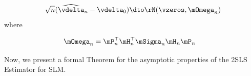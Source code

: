\documentclass[english,12pt]{book}\usepackage[]{graphicx}\usepackage[]{xcolor}
\begin{document}
\begin{equation*}
\sqrt{n}(\widehat{\vdelta}_{n} - \vdelta_0) \dto \rN(\vzeros, \mOmega_n)
\end{equation*}
%
where

\begin{equation}
  \begin{aligned}
      \mOmega_n& = \mP^\top_n\mH^\top_n\mSigma_n\mH_n\mP_n
  \end{aligned}
\end{equation}





%


Now, we present a formal Theorem for the asymptotic properties of the 2SLS Estimator for SLM.
\end{document}

